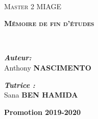 \begin{titlepage}
\begin{center}

\setlength{\parindent}{0pt}

~\\[1cm]


\textsc{\Huge Master 2 MIAGE}\\[0.5cm]

\vspace{5mm}

\textsc{\huge \bfseries  Mémoire de fin d'études}\\[1.5cm]



\HRule

{\huge \bfseries \thetitle \\[0.4cm] }


\HRule

\vspace{5mm}

\begin{minipage}{0.4\textwidth}
\begin{flushleft} \large
\emph{\textbf{Auteur:}}\\
Anthony \textsc{\textbf{NASCIMENTO}}
\end{flushleft}
\end{minipage}
\begin{minipage}{0.4\textwidth}
\begin{flushright} \large
\emph{\textbf{Tutrice :}} \\
Sana \textsc{\textbf{BEN HAMIDA}}
\end{flushright}
\end{minipage}

\vfill

{\huge \bfseries Promotion 2019-2020}

\end{center}
\end{titlepage}
